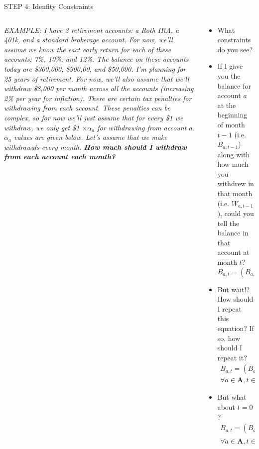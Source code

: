 \documentclass[10pt, aspectratio=169]{beamer}
\newcommand{\retirementProblem}{\textit{EXAMPLE: I have 3 retirement accounts: a Roth IRA, a 401k, and a standard brokerage account. For now, we'll assume we know the eact early return for each of these accounts: 7\%, 10\%, and 12\%. The balance on these accounts today are \$300,000, \$900,00, and \$50,000. I'm planning for 25 years of retirement. For now, we'll also assume that we'll withdraw \$8,000 per month across all the accounts (increasing 2\% per year for inflation). There are certain tax penalties for withdrawing from each account. These penalties can be complex, so for now we'll just assume that for every \$1 we withdraw, we only get \$1 $\times \alpha_a$ for withdrawing from account $a$. $\alpha_a$ values are given below. Let's assume that we make withdrawals every month. \textbf{How much should I withdraw from each account each month?}}}
\begin{document}
\begin{frame}{STEP 4: Idenfity Constraints}
    \begin{columns}
        \begin{column}{0.5\textwidth}
            \retirementProblem
        \end{column}
        \begin{column}{0.5\textwidth}
            \begin{itemize}
                \item What constraints do you see?
                \item If I gave you the balance for account $a$ at the beginning of month $t-1$ (i.e. $B_{a,t-1}$) along with how much you withdrew in that month (i.e. $W_{a,t-1}$), could you tell the balance in that account at month $t$?
                \pause
                \vspace{-0.2cm}
                $$B_{a,t} = \left(B_{a,t-1}-W_{a,t-1}\right) \times (1 + \delta_a)$$
                \item But wait!? How should I repeat this equation? If so, how should I repeat it?
                \pause
                \vspace{-0.2cm}
                \begin{equation}
                    \begin{split}
                    B_{a,t} = \left(B_{a,t-1}-W_{a,t-1}\right) \times (1 + \delta_a) \\ \forall a \in \textbf{A}, t \in \textbf{T}
                    \end{split} \tag*{}
                \end{equation}
                \item But what about $t=0$?
                \pause
                \vspace{-0.2cm}
                \begin{equation}
                    \begin{split}
                    B_{a,t} = \left(B_{a,t-1}-W_{a,t-1}\right) \times (1 + \delta_a) \\ \forall a \in \textbf{A}, t \in \textbf{T}^{NON-INIT}
                    \end{split} \tag*{}
                \end{equation}
            \end{itemize}
        \end{column}
    \end{columns}
\end{frame}
\end{document}
